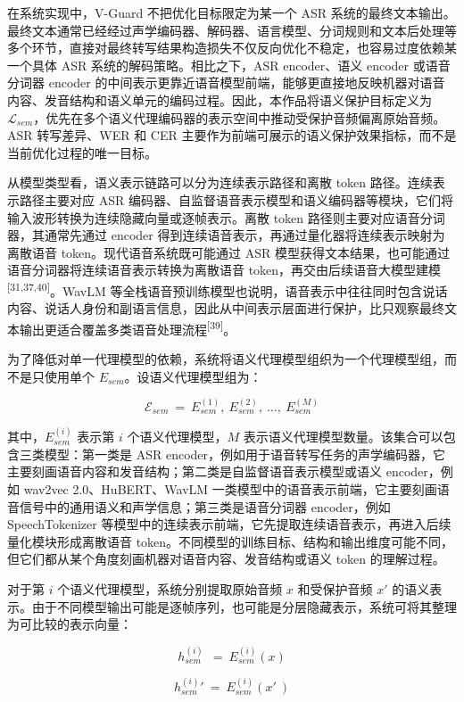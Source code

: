 在系统实现中，V-Guard 不把优化目标限定为某一个 ASR
系统的最终文本输出。最终文本通常已经经过声学编码器、解码器、语言模型、分词规则和文本后处理等多个环节，直接对最终转写结果构造损失不仅反向优化不稳定，也容易过度依赖某一个具体
ASR 系统的解码策略。相比之下，ASR encoder、语义 encoder 或语音分词器
encoder
的中间表示更靠近语音模型前端，能够更直接地反映机器对语音内容、发音结构和语义单元的编码过程。因此，本作品将语义保护目标定义为
\(\mathcal{L}_{sem}\)，优先在多个语义代理编码器的表示空间中推动受保护音频偏离原始音频。ASR
转写差异、WER 和 CER
主要作为前端可展示的语义保护效果指标，而不是当前优化过程的唯一目标。

从模型类型看，语义表示链路可以分为连续表示路径和离散 token
路径。连续表示路径主要对应 ASR
编码器、自监督语音表示模型和语义编码器等模块，它们将输入波形转换为连续隐藏向量或逐帧表示。离散
token 路径则主要对应语音分词器，其通常先通过 encoder
得到连续语音表示，再通过量化器将连续表示映射为离散语音
token。现代语音系统既可能通过 ASR
模型获得文本结果，也可能通过语音分词器将连续语音表示转换为离散语音
token，再交由后续语音大模型建模\textsuperscript{{[}31,37,40{]}}。WavLM
等全栈语音预训练模型也说明，语音表示中往往同时包含说话内容、说话人身份和副语言信息，因此从中间表示层面进行保护，比只观察最终文本输出更适合覆盖多类语音处理流程\textsuperscript{{[}39{]}}。

为了降低对单一代理模型的依赖，系统将语义代理模型组织为一个代理模型组，而不是只使用单个
\(E_{sem}\)。设语义代理模型组为：

\[\mathcal{E}_{sem}\  = \ E_{sem}^{(1)},\ E_{sem}^{(2)},\ \ldots,\ E_{sem}^{(M)}\]

其中，\(E_{sem}^{(i)}\) 表示第 \(i\) 个语义代理模型，\(M\)
表示语义代理模型数量。该集合可以包含三类模型：第一类是 ASR
encoder，例如用于语音转写任务的声学编码器，它主要刻画语音内容和发音结构；第二类是自监督语音表示模型或语义
encoder，例如 wav2vec 2.0、HuBERT、WavLM
一类模型中的语音表示前端，它主要刻画语音信号中的通用语义和声学信息；第三类是语音分词器
encoder，例如 SpeechTokenizer
等模型中的连续表示前端，它先提取连续语音表示，再进入后续量化模块形成离散语音
token。不同模型的训练目标、结构和输出维度可能不同，但它们都从某个角度刻画机器对语音内容、发音结构或语义
token 的理解过程。

对于第 \(i\) 个语义代理模型，系统分别提取原始音频 \(x\) 和受保护音频
\(x'\)
的语义表示。由于不同模型输出可能是逐帧序列，也可能是分层隐藏表示，系统可将其整理为可比较的表示向量：

\[h_{sem}^{(i)}\ \  = \ E_{sem}^{(i)}(x)\]

\[{h_{sem}^{(i)}}'\  = \ E_{sem}^{(i)}(x'\ )\]


